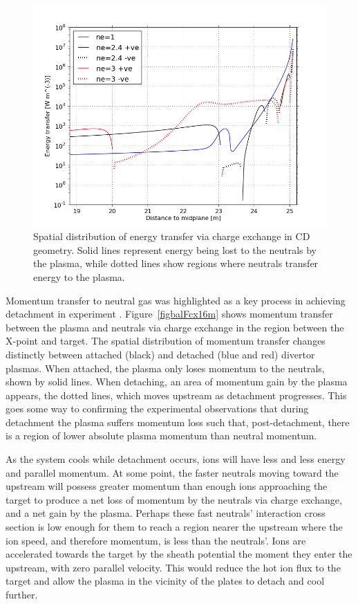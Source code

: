 \documentclass[12pt]{article}  %
\begin{document}
\begin{figure}
\includegraphics[scale=0.6]{Figures/sol1d/balEcx19m.png}
\centering
\caption{Spatial distribution of energy transfer via charge exchange in CD geometry. Solid lines represent energy being lost to the neutrals by the plasma, while dotted lines show regions where neutrals transfer energy to the plasma.}\label{figbalEcx19m}
\end{figure}

Momentum transfer to neutral gas was highlighted as a key process in achieving detachment in experiment \cite{Loarte1998, Wischmeier2009}. Figure~\ref{figbalFcx16m} shows momentum transfer between the plasma and neutrals via charge exchange in the region between the X-point and target. The spatial distribution of momentum transfer changes distinctly between attached (black) and detached (blue and red) divertor plasmas. When attached, the plasma only loses momentum to the neutrals, shown by solid lines. When detaching, an area of momentum gain by the plasma appears, the dotted lines, which moves upstream as detachment progresses. This goes some way to confirming the experimental observations \cite{Loarte1998} that during detachment the plasma suffers momentum loss such that, post-detachment, there is a region of lower absolute plasma momentum than neutral momentum.

As the system cools while detachment occurs, ions will have less and less energy and parallel momentum. At some point, the faster neutrals moving toward the upstream will possess greater momentum than enough ions approaching the target to produce a net loss of momentum by the neutrals via charge exchange, and a net gain by the plasma. Perhaps these fast neutrals' interaction cross section is low enough for them to reach a region nearer the upstream where the ion speed, and therefore momentum, is less than the neutrals'. Ions are accelerated towards the target by the sheath potential the moment they enter the upstream, with zero parallel velocity. This would reduce the hot ion flux to the target and allow the plasma in the vicinity of the plates to detach and cool further. 
\end{document}
